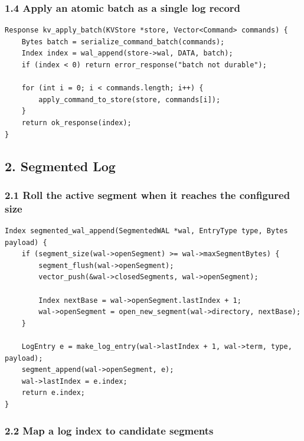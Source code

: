 \documentclass[10pt,letterpaper]{article}
\begin{document}
\subsubsection*{1.4 Apply an atomic batch as a single log record}

\begin{verbatim}
Response kv_apply_batch(KVStore *store, Vector<Command> commands) {
    Bytes batch = serialize_command_batch(commands);
    Index index = wal_append(store->wal, DATA, batch);
    if (index < 0) return error_response("batch not durable");

    for (int i = 0; i < commands.length; i++) {
        apply_command_to_store(store, commands[i]);
    }
    return ok_response(index);
}
\end{verbatim}

\subsection*{2. Segmented Log}

\subsubsection*{2.1 Roll the active segment when it reaches the configured size}

\begin{verbatim}
Index segmented_wal_append(SegmentedWAL *wal, EntryType type, Bytes payload) {
    if (segment_size(wal->openSegment) >= wal->maxSegmentBytes) {
        segment_flush(wal->openSegment);
        vector_push(&wal->closedSegments, wal->openSegment);

        Index nextBase = wal->openSegment.lastIndex + 1;
        wal->openSegment = open_new_segment(wal->directory, nextBase);
    }

    LogEntry e = make_log_entry(wal->lastIndex + 1, wal->term, type, payload);
    segment_append(wal->openSegment, e);
    wal->lastIndex = e.index;
    return e.index;
}
\end{verbatim}

\subsubsection*{2.2 Map a log index to candidate segments}
\end{document}
